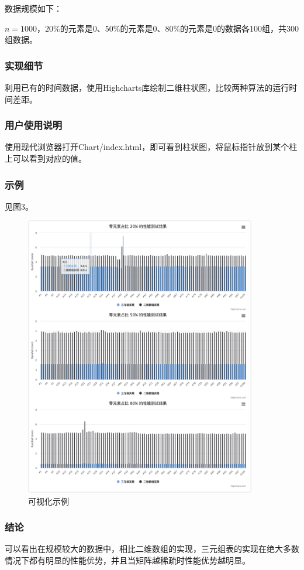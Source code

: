 \documentclass{article}
\begin{document}
数据规模如下：

$n=1000$，$20\%$的元素是0、$50\%$的元素是0、$80\%$的元素是0的数据各100组，共300组数据。

\subsubsection{实现细节}

利用已有的时间数据，使用Highcharts库绘制二维柱状图，比较两种算法的运行时间差距。

\subsubsection{用户使用说明}

使用现代浏览器打开Chart/index.html，即可看到柱状图，将鼠标指针放到某个柱上可以看到对应的值。

\subsubsection{示例}

见图3。

\begin{figure}[htbp]
    
    \centering\includegraphics[width=0.9\textwidth]{./Images/pic3_3.png}
    
    \caption{可视化示例}
    
\end{figure}

\subsubsection{结论}

可以看出在规模较大的数据中，相比二维数组的实现，三元组表的实现在绝大多数情况下都有明显的性能优势，并且当矩阵越稀疏时性能优势越明显。
\end{document}

